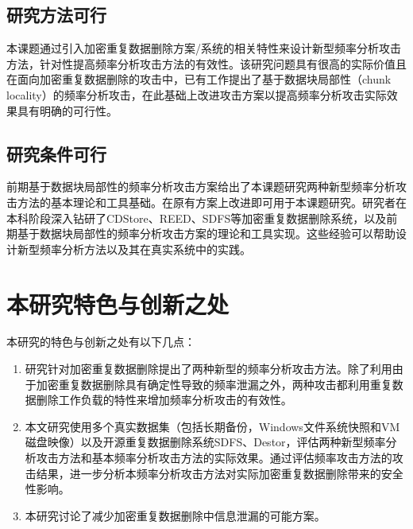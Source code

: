 \subsection{研究方法可行}

本课题通过引入加密重复数据删除方案/系统的相关特性来设计新型频率分析攻击方法，针对性提高频率分析攻击方法的有效性。该研究问题具有很高的实际价值且在面向加密重复数据删除的攻击中，已有工作提出了基于数据块局部性（chunk locality）的频率分析攻击，在此基础上改进攻击方案以提高频率分析攻击实际效果具有明确的可行性。

\subsection{研究条件可行}

前期基于数据块局部性的频率分析攻击方案给出了本课题研究两种新型频率分析攻击方法的基本理论和工具基础。在原有方案上改进即可用于本课题研究。研究者在本科阶段深入钻研了CDStore、REED、SDFS等加密重复数据删除系统，以及前期基于数据块局部性的频率分析攻击方案的理论和工具实现。这些经验可以帮助设计新型频率分析方法以及其在真实系统中的实践。

\section{本研究特色与创新之处}

本研究的特色与创新之处有以下几点：

\begin{enumerate}
    \item 研究针对加密重复数据删除提出了两种新型的频率分析攻击方法。除了利用由于加密重复数据删除具有确定性导致的频率泄漏之外，两种攻击都利用重复数据删除工作负载的特性来增加频率分析攻击的有效性。
    \item 本文研究使用多个真实数据集（包括长期备份，Windows文件系统快照和VM磁盘映像）以及开源重复数据删除系统SDFS、Destor，评估两种新型频率分析攻击方法和基本频率分析攻击方法的实际效果。通过评估频率攻击方法的攻击结果，进一步分析本频率分析攻击方法对实际加密重复数据删除带来的安全性影响。
    \item 本研究讨论了减少加密重复数据删除中信息泄漏的可能方案。
\end{enumerate}

